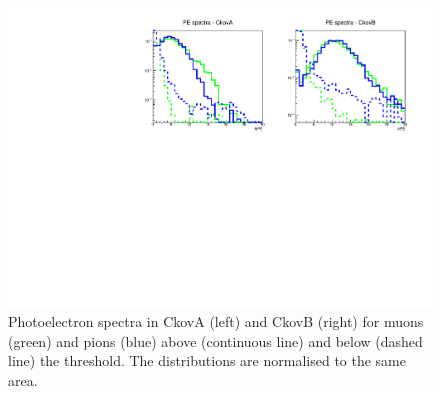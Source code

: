 \begin{figure}[htb!]
  \begin{center}
    \includegraphics[width=0.85\columnwidth]{./03-Ckov/Figures/Ckov_photoelectrons_spectra.pdf}
    \caption{Photoelectron spectra in CkovA (left) and CkovB (right) for muons (green) and pions (blue) above (continuous line) and below (dashed line) the threshold. The distributions are normalised to the same area.}
    \label{fig:ckov3}
  \end{center}
\end{figure}
